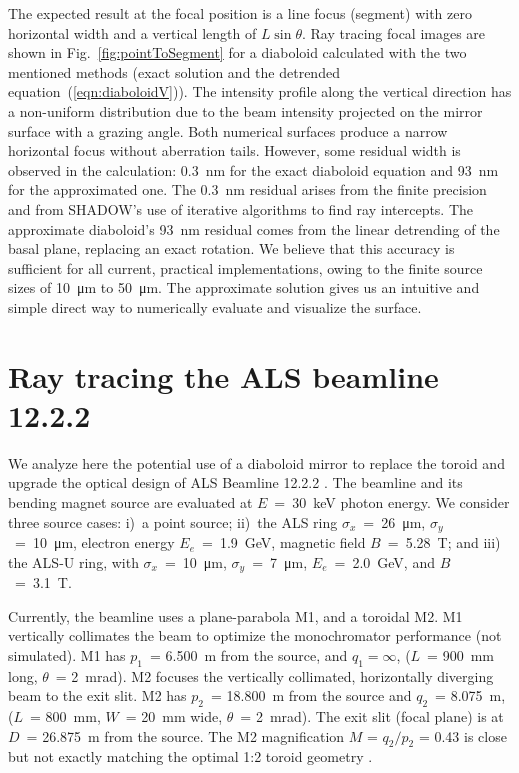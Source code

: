 \documentclass[preprint]{iucr}       %
\newcommand{\inblue}[1]{{\color{blue}#1}}
\begin{document}
The expected result at the focal position is a line focus (segment) with zero horizontal width and a vertical length of $L\sin\theta$. Ray tracing focal images are shown in Fig.~\ref{fig:pointToSegment} for a diaboloid calculated with the two mentioned methods (exact solution and the detrended equation~(\ref{eqn:diaboloidV})). The intensity profile along the vertical direction has a non-uniform distribution due to the beam intensity projected on the mirror surface with a grazing angle. Both numerical surfaces produce a narrow horizontal focus without aberration tails. However, some residual width is observed in the calculation: \SI{0.3}{\nano\meter} for the exact diaboloid equation and \SI{93}{\nano\meter} for the approximated one. The \SI{0.3}{\nano\meter} residual arises from the finite precision and from SHADOW's use of iterative algorithms to find ray intercepts.
The approximate diaboloid's \SI{93}{\nano\meter} residual comes from the linear detrending of the basal plane, replacing an exact rotation. We believe that this accuracy is sufficient for all current, practical implementations, owing to the finite source sizes of \SI{10}{\micro\meter} to \SI{50}{\micro\meter}. The approximate solution gives us an intuitive and simple direct way to numerically evaluate and visualize the surface.

\section{Ray tracing the ALS beamline 12.2.2}
\label{sec:beamline}

We analyze here the potential use of a diaboloid mirror to replace the toroid and upgrade the optical design of ALS Beamline 12.2.2 \cite{bl1222,MacDowell2004}. The beamline and its bending magnet source are evaluated at $E$~=~\SI{30}{\kilo\electronvolt} photon energy. We consider three source cases: i)~a point source; ii)~the ALS ring
$\sigma_x$~=~\SI{26}{\micro\meter}, $\sigma_y$~=~\SI{10}{\micro\meter}, 
electron energy $E_e$~=~\SI{1.9}{\giga\electronvolt}, magnetic field $B$~=~\SI{5.28}{\tesla}; and iii) the ALS-U ring, with $\sigma_x$~=~\SI{10}{\micro\meter}, $\sigma_y$~=~\SI{7}{\micro\meter}, $E_e$~=~\SI{2.0}{\giga\electronvolt}, and $B$~=~\SI{3.1}{\tesla}. 

Currently, the beamline uses a plane-parabola M1, and a toroidal M2. M1 vertically collimates the beam to optimize the monochromator performance (not simulated). M1 has $p_1$~= \SI{6.500}{\meter} from the source, and $q_1=\infty$, ($L$~= \SI{900}{\milli\meter} long, $\theta$~= \SI{2}{\milli\radian}). M2 focuses the vertically collimated, horizontally diverging beam to the exit slit. M2 has $p_2$~= \SI{18.800}{\meter} from the source and $q_2$~= \SI{8.075}{\meter}, (\inblue{$L$~= \SI{800}{\milli\meter}}, $W$~= \SI{20}{\milli\meter} wide, $\theta$~= \SI{2}{\milli\radian}). The exit slit (focal plane) is at $D$~= \SI{26.875}{\meter} from the source. The M2 magnification $M$ = $q_2/p_2$ = 0.43 is close but not exactly matching the optimal 1:2 toroid geometry \cite{MacDowell2004}.
\end{document}
